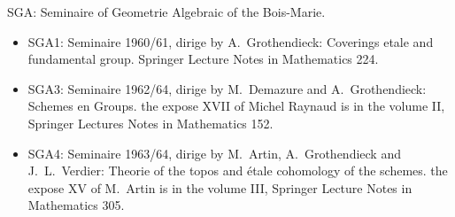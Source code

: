 \documentclass[11pt,a4paper]{article}
\theoremstyle{plain}
\theoremstyle{definition}
\begin{document}
SGA: Seminaire of Geometrie Algebraic of the Bois-Marie.

\begin{itemize}
\item SGA1: Seminaire 1960/61, dirige by A.\ Grothendieck: Coverings etale and fundamental group. Springer Lecture Notes in Mathematics 224.
\item SGA3: Seminaire 1962/64, dirige by M.\ Demazure and A.\ Grothendieck: Schemes en Groups. the expose XVII of Michel Raynaud is in the volume II, Springer Lectures Notes in Mathematics 152.
\item SGA4: Seminaire 1963/64, dirige by M.\ Artin, A.\ Grothendieck and J.\ L.\ Verdier: Theorie of the topos and étale cohomology of the schemes. the expose XV of M.\ Artin is in the volume III, Springer Lecture Notes in Mathematics 305.
\end{itemize}
\end{document}
